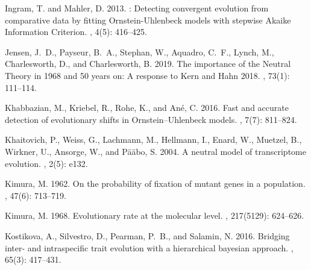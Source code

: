 \documentclass{article}
\begin{document}
\begin{thebibliography}{}
    Ingram, T. and Mahler, D. 2013.
    : Detecting convergent evolution from comparative data by
    fitting {{Ornstein-Uhlenbeck}} models with stepwise {{Akaike Information
    Criterion}}.
    , {4}(5): 416--425.

    Jensen, J.~D., Payseur, B.~A., Stephan, W., Aquadro, C.~F., Lynch, M.,
    Charlesworth, D., and Charlesworth, B. 2019.
    \newblock The importance of the {{Neutral Theory}} in 1968 and 50 years on:
        {{A}} response to {{Kern}} and {{Hahn}} 2018.
    , {73}(1): 111--114.

    Khabbazian, M., Kriebel, R., Rohe, K., and An{\'e}, C. 2016.
    \newblock Fast and accurate detection of evolutionary shifts in
        {{Ornstein}}--{{Uhlenbeck}} models.
    , {7}(7): 811--824.

    Khaitovich, P., Weiss, G., Lachmann, M., Hellmann, I., Enard, W., Muetzel, B.,
    Wirkner, U., Ansorge, W., and P{\"a}{\"a}bo, S. 2004.
    \newblock A neutral model of transcriptome evolution.
    , {2}(5): e132.

    Kimura, M. 1962.
    \newblock On the probability of fixation of mutant genes in a population.
    , {47}(6): 713--719.

    Kimura, M. 1968.
    \newblock Evolutionary rate at the molecular level.
    , {217}(5129): 624--626.

    Kostikova, A., Silvestro, D., Pearman, P.~B., and Salamin, N. 2016.
    \newblock Bridging inter- and intraspecific trait evolution with a hierarchical
    bayesian approach.
    , {65}(3): 417--431.


\end{thebibliography}
\end{document}
